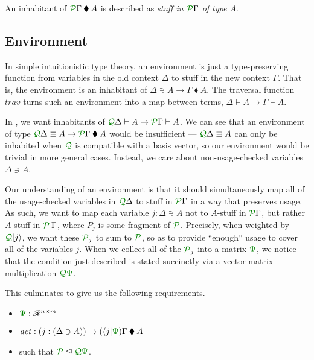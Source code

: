 \documentclass[submission,copyright,creativecommons]{eptcs}
\newcommand{\kitrel}{\mathbin{\blacklozenge}}
\begin{document}
An inhabitant of $\ctx{\Gamma}{P} \kitrel A$ is described as
\emph{stuff in $\ctx{\Gamma}{P}$ of type $A$}.

\subsection{Environment}

In simple intuitionistic type theory, an environment is just a type-preserving
function from variables in the old context $\Delta$ to stuff in the new context
$\Gamma$.
That is, the environment is an inhabitant of
$\Delta \ni A \to \Gamma \kitrel A$.
The traversal function $\mathit{trav}$ turns such an environment into a map
between terms, $\Delta \vdash A \to \Gamma \vdash A$.

In \name, we want inhabitants of
$\ctx{\Delta}{Q} \vdash A \to \ctx{\Gamma}{P} \vdash A$.
We can see that an environment of type
$\ctx{\Delta}{Q} \lvar A \to \ctx{\Gamma}{P} \kitrel A$ would
be insufficient --- $\ctx{\Delta}{Q} \lvar A$ can only be inhabited when
$\resctx Q$ is compatible with a basis vector, so our environment would be
trivial in more general cases.
Instead, we care about non-usage-checked variables $\Delta \ni A$.

Our understanding of an environment is that it should simultaneously map all of
the usage-checked variables in $\ctx{\Delta}{Q}$ to stuff in $\ctx{\Gamma}{P}$
in a way that preserves usage.
As such, we want to map each variable $j : \Delta \ni A$ not to $A$-stuff in
$\ctx{\Gamma}{P}$, but rather $A$-stuff in $\ctx{\Gamma}{P_j}$, where $P_j$ is
some fragment of $\resctx P$.
Precisely, when weighted by $\resctx Q\lvert j \rangle$, we want these
$\resctx P_j$ to sum to $\resctx P$, so as to provide ``enough'' usage to cover
all of the variables $j$.
When we collect all of the $\resctx P_j$ into a matrix $\rescomment\Psi$, we
notice that the condition just described is stated succinctly via a
vector-matrix multiplication $\resctx Q\rescomment\Psi$.


This culminates to give us the following requirements.

\begin{itemize}
  \item $\rescomment\Psi : \mathscr R^{n \times m}$
  \item $\mathit{act} :
    (j : (\Delta \ni A)) \to (\langle j \rvert\rescomment\Psi)\Gamma \kitrel A$
  \item such that $\resctx P \subres \resctx Q \rescomment\Psi$.
\end{itemize}
\end{document}
